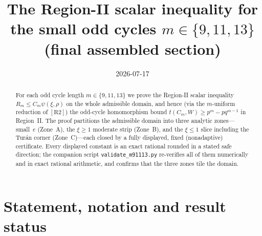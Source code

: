 \documentclass[11pt]{amsart}
\title[Region II for the small odd cycles $m\in\{9,11,13\}$]%
{The Region-II scalar inequality for the small odd cycles $m\in\{9,11,13\}$\\
(final assembled section)}
\author{}
\date{2026-07-17}
\newcommand{\RII}{[\textrm{R2}]}
\begin{document}
\maketitle

\begin{abstract}
For each odd cycle length $m\in\{9,11,13\}$ we prove the Region-II scalar
inequality $R_m\le C_m\psi(\xi,\rho)$ on the whole admissible domain, and hence
(via the $m$-uniform reduction of $\RII$) the odd-cycle homomorphism bound
$t(C_m,W)\ge p^m-pq^{m-1}$ in Region~II.  The proof partitions the admissible
domain into three analytic zones---small~$e$ (Zone~A), the $\xi\ge1$ moderate
strip (Zone~B), and the $\xi\le1$ slice including the Tur\'an corner
(Zone~C)---each closed by a fully displayed, fixed (non\-adaptive) certificate.
Every displayed constant is an exact rational rounded in a stated safe
direction; the companion script \texttt{validate\_m91113.py} re-verifies all of
them numerically and in exact rational arithmetic, and confirms that the three
zones tile the domain.
\end{abstract}

\section{Statement, notation and result status}\label{sec:intro}
\end{document}
